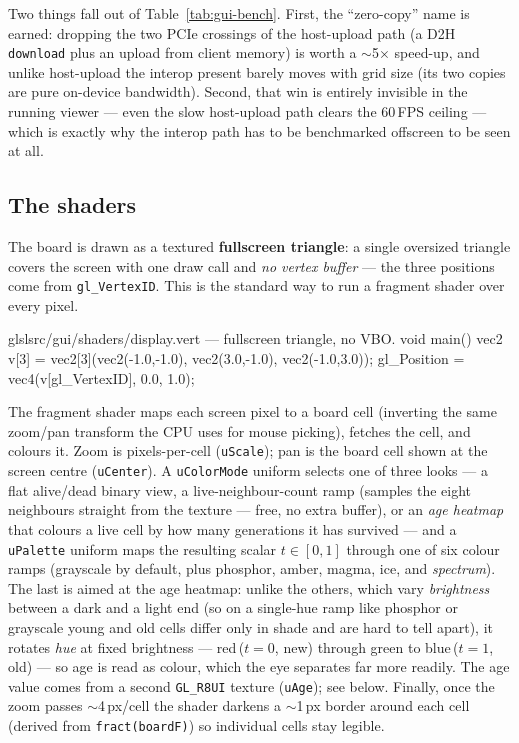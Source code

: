 \documentclass[
	english,
	letterpaper, oneside
]{article}
\begin{document}
Two things fall out of Table~\ref{tab:gui-bench}. First, the ``zero-copy'' name is
earned: dropping the two PCIe crossings of the host-upload path (a D2H
\texttt{download} plus an upload from client memory) is worth a $\sim$5$\times$
speed-up, and unlike host-upload the interop present barely moves with grid size
(its two copies are pure on-device bandwidth). Second, that win is entirely
invisible in the running viewer --- even the slow host-upload path clears the
60\,FPS ceiling --- which is exactly why the interop path has to be benchmarked
offscreen to be seen at all.

\subsection{The shaders}
\label{sec:gui-shaders}

The board is drawn as a textured \textbf{fullscreen triangle}: a single oversized
triangle covers the screen with one draw call and \emph{no vertex buffer} --- the
three positions come from \texttt{gl\_VertexID}. This is the standard way to run a
fragment shader over every pixel.

\begin{sourcecode}{glsl}{src/gui/shaders/display.vert --- fullscreen triangle, no VBO.}
void main() {
    vec2 v[3] = vec2[3](vec2(-1.0,-1.0), vec2(3.0,-1.0), vec2(-1.0,3.0));
    gl_Position = vec4(v[gl_VertexID], 0.0, 1.0);
}
\end{sourcecode}

The fragment shader maps each screen pixel to a board cell (inverting the same
zoom/pan transform the CPU uses for mouse picking), fetches the cell, and colours
it. Zoom is pixels-per-cell (\texttt{uScale}); pan is the board cell shown at the
screen centre (\texttt{uCenter}). A \texttt{uColorMode} uniform selects one of three
looks --- a flat alive/dead binary view, a live-neighbour-count ramp (samples the
eight neighbours straight from the texture --- free, no extra buffer), or an
\emph{age heatmap} that colours a live cell by how many generations it has survived
--- and a \texttt{uPalette} uniform maps the resulting scalar $t\in[0,1]$ through
one of six colour ramps (grayscale by default, plus phosphor, amber, magma, ice, and
\emph{spectrum}). The last is aimed at the age heatmap: unlike the others, which vary
\emph{brightness} between a dark and a light end (so on a single-hue ramp like phosphor
or grayscale young and old cells differ only in shade and are hard to tell apart), it
rotates \emph{hue} at fixed brightness --- red\,($t{=}0$, new) through green to
blue\,($t{=}1$, old) --- so age is read as colour, which the eye separates far more
readily. The age value
comes from a second \texttt{GL\_R8UI} texture (\texttt{uAge}); see below. Finally,
once the zoom passes $\sim$4\,px/cell the shader darkens a $\sim$1\,px border around
each cell (derived from \texttt{fract(boardF)}) so individual cells stay legible.
\end{document}
